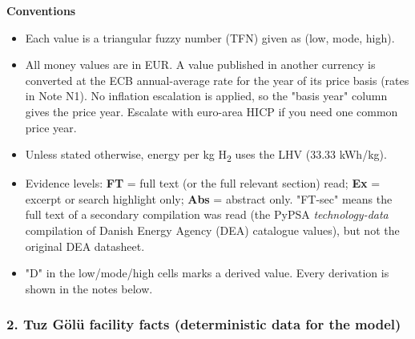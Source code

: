 \documentclass[11pt,a4paper]{article}
\begin{document}
\textbf{Conventions}

\begin{itemize}\setlength\itemsep{1pt}

  \item Each value is a triangular fuzzy number (TFN) given as (low, mode, high).

  \item All money values are in EUR. A value published in another currency is converted at the ECB annual-average rate for the year of its price basis (rates in Note N1). No inflation escalation is applied, so the "basis year" column gives the price year. Escalate with euro-area HICP if you need one common price year.

  \item Unless stated otherwise, energy per kg H\textsubscript{2} uses the LHV (33.33 kWh/kg).

  \item Evidence levels: \textbf{FT} = full text (or the full relevant section) read; \textbf{Ex} = excerpt or search highlight only; \textbf{Abs} = abstract only. "FT-sec" means the full text of a secondary compilation was read (the PyPSA \textit{technology-data} compilation of Danish Energy Agency (DEA) catalogue values), but not the original DEA datasheet.

  \item "D" in the low/mode/high cells marks a derived value. Every derivation is shown in the notes below.

\end{itemize}

\subsubsection{2. Tuz Gölü facility facts (deterministic data for the model)}
\end{document}

